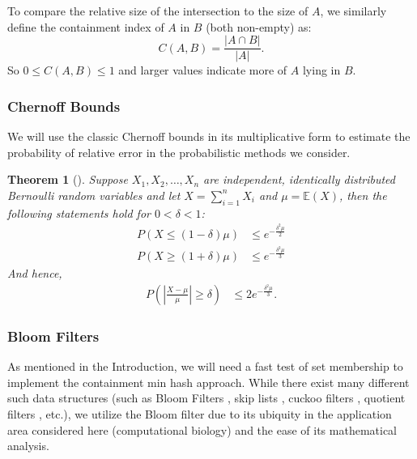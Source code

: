 \documentclass[11pt,reqno]{amsart}
\newtheorem{theorem}{Theorem}[section]
\theoremstyle{remark}
\numberwithin{equation}{section}
\begin{document}
To compare the relative size of the intersection to the size of $A$, we similarly define the containment index of $A$ in $B$ (both non-empty) as:
$$
C(A,B)=\frac{|A\cap B|}{|A|}.
$$
So $0\leq C(A,B)\leq 1$ and larger values indicate more of $A$ lying in $B$.

\subsubsection{Chernoff Bounds}
We will use the classic Chernoff bounds in its multiplicative form to estimate the probability of relative error in the probabilistic methods we consider.
 \begin{theorem}[{\cite[Thm 4.4-4.5]{mitzenmacher2005probability}}]
 \label{chernoffbd}
Suppose $X_1,X_2,\dots,X_n$ are independent, identically distributed Bernoulli random variables and let $X = \sum_{i=1}^nX_i$ and $\mu=\mathbb{E}(X)$, then the following statements hold for $0<\delta<1$:
\begin{align}
P(X\leq (1-\delta)\mu)&\leq e^{-\frac{\delta^2\mu}{2}}\label{chernoffbd1}\\
P(X\geq (1+\delta)\mu)&\leq e^{-\frac{\delta^2\mu}{3}}\label{chernoffbd2}
\end{align}
And hence,
\begin{align}
P\left(\left|\frac{X-\mu}{\mu}\right|\geq \delta \right)&\leq 2e^{-\frac{\delta^2\mu}{3}} \label{twosidedchernoff}.
\end{align}
\end{theorem}  

\subsubsection{Bloom Filters}
As mentioned in the Introduction, we will need a fast test of set membership to implement the containment min hash approach. While there exist many different such data structures (such as Bloom Filters \cite{bloom1970space}, skip lists \cite{pugh1990skip}, cuckoo filters \cite{fan2014cuckoo}, quotient filters \cite{bender2012don}, etc.), we utilize the Bloom filter due to its ubiquity \cite{melsted2011efficient,heo2014bless,chikhi2012space,stranneheim2010classification,chu2014biobloom,ondov2016mash,solomon2016fast,pell2012scaling} in the application area considered here (computational biology) and the ease of its mathematical analysis.
\end{document}
